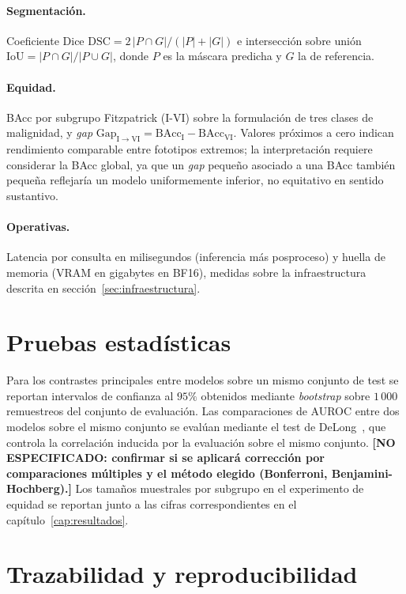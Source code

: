 \paragraph{Segmentación.}
Coeficiente Dice
$\mathrm{DSC} = 2\,|P\cap G|/(|P|+|G|)$ e intersección sobre unión
$\mathrm{IoU} = |P\cap G|/|P\cup G|$, donde $P$ es la máscara
predicha y $G$ la de referencia.

\paragraph{Equidad.}
BAcc por subgrupo Fitzpatrick (I-VI) sobre la formulación de tres
clases de malignidad, y \emph{gap}
$\mathrm{Gap}_{\mathrm{I}\to\mathrm{VI}}
= \mathrm{BAcc}_{\mathrm{I}} - \mathrm{BAcc}_{\mathrm{VI}}$.
Valores próximos a cero indican rendimiento comparable entre
fototipos extremos; la interpretación requiere considerar la BAcc
global, ya que un \emph{gap} pequeño asociado a una BAcc también
pequeña reflejaría un modelo uniformemente inferior, no equitativo
en sentido sustantivo.

\paragraph{Operativas.}
Latencia por consulta en milisegundos (inferencia más posproceso)
y huella de memoria (VRAM en gigabytes en BF16), medidas sobre la
infraestructura descrita en secci\'on~\ref{sec:infraestructura}.

\section{Pruebas estadísticas}
\label{sec:estadistica}

Para los contrastes principales entre modelos sobre un mismo
conjunto de test se reportan intervalos de confianza al $95\%$
obtenidos mediante \emph{bootstrap} sobre $1\,000$ remuestreos del
conjunto de evaluación. Las comparaciones de AUROC entre dos
modelos sobre el mismo conjunto se evalúan mediante el test de
DeLong~\cite{delong1988}, que controla la correlación inducida por
la evaluación sobre el mismo conjunto. \textbf{[NO ESPECIFICADO:
confirmar si se aplicará corrección por comparaciones múltiples y
el método elegido (Bonferroni, Benjamini-Hochberg).]} Los tamaños
muestrales por subgrupo en el experimento de equidad se reportan
junto a las cifras correspondientes en el
capítulo~\ref{cap:resultados}.

\section{Trazabilidad y reproducibilidad}
\label{sec:reproducibilidad}

